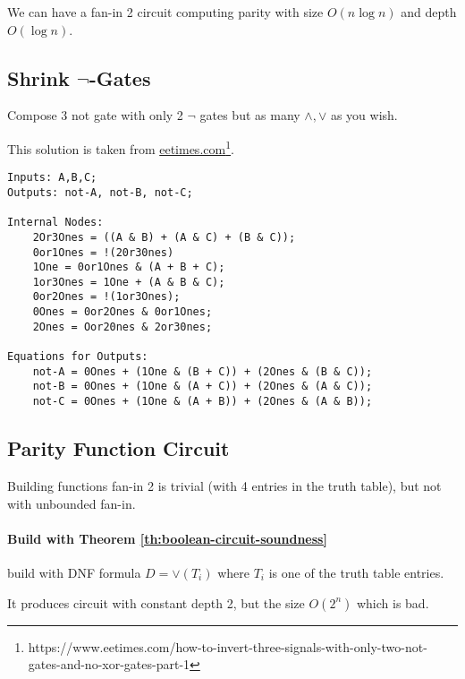 \begin{remark}
We can have a fan-in 2 circuit computing parity with size \by $O(n \log n)$ and depth \by $O(\log n)$.
\end{remark}

\subsection{Shrink \texorpdfstring{$\lnot$-Gates}{NOT Gates}} 

Compose 3 not gate with only 2 \(\lnot\) gates but as many \(\land, \lor\) as you wish.

This solution is taken from \href{https://www.eetimes.com/how-to-invert-three-signals-with-only-two-not-gates-and-no-xor-gates-part-1}{eetimes.com}\footnote{https://www.eetimes.com/how-to-invert-three-signals-with-only-two-not-gates-and-no-xor-gates-part-1}.

\begin{verbatim}
Inputs: A,B,C;
Outputs: not-A, not-B, not-C;

Internal Nodes: 
    2Or3Ones = ((A & B) + (A & C) + (B & C));
    0or1Ones = !(20r30nes)
    1One = 0or1Ones & (A + B + C); 
    1or3Ones = 1One + (A & B & C);
    0or2Ones = !(1or3Ones);
    0Ones = 0or2Ones & 0or1Ones;
    2Ones = Oor20nes & 2or30nes;

Equations for Outputs: 
    not-A = 0Ones + (1One & (B + C)) + (2Ones & (B & C)); 
    not-B = 0Ones + (1One & (A + C)) + (2Ones & (A & C));
    not-C = 0Ones + (1One & (A + B)) + (2Ones & (A & B));
\end{verbatim}

\subsection{Parity Function Circuit}

\begin{remark}
Building functions fan-in 2 is trivial (with 4 entries in the truth
table), but not with unbounded fan-in.
\end{remark}

\paragraph{Build with Theorem \ref{th:boolean-circuit-soundness}} build with DNF formula \(D = \lor (T_i)\) where \(T_i\) is one of the truth table entries.

It produces circuit with constant depth 2, but the size \by \( O(2^{n})\) which is bad.

